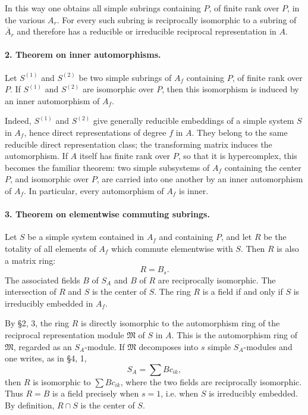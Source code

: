 \documentclass[11pt]{article}
\providecommand{\frM}{\mathfrak M}
\begin{document}
In this way one obtains all simple subrings containing \(P\), of finite rank over \(P\), in the various \(A_r\). For every such subring is reciprocally isomorphic to a subring of \(\overline A_r\) and therefore has a reducible or irreducible reciprocal representation in \(A\).

\paragraph{2. Theorem on inner automorphisms.}
Let \(S^{(1)}\) and \(S^{(2)}\) be two simple subrings of \(A_f\) containing \(P\), of finite rank over \(P\). If \(S^{(1)}\) and \(S^{(2)}\) are isomorphic over \(P\), then this isomorphism is induced by an inner automorphism of \(A_f\).

Indeed, \(S^{(1)}\) and \(S^{(2)}\) give generally reducible embeddings of a simple system \(S\) in \(A_f\), hence direct representations of degree \(f\) in \(A\). They belong to the same reducible direct representation class; the transforming matrix induces the automorphism. If \(A\) itself has finite rank over \(P\), so that it is hypercomplex, this becomes the familiar theorem: two simple subsystems of \(A_f\) containing the center \(P\), and isomorphic over \(P\), are carried into one another by an inner automorphism of \(A_f\). In particular, every automorphism of \(A_f\) is inner.

\paragraph{3. Theorem on elementwise commuting subrings.}
Let \(S\) be a simple system contained in \(A_f\) and containing \(P\), and let \(R\) be the totality of all elements of \(A_f\) which commute elementwise with \(S\). Then \(R\) is also a matrix ring:
\[
        R=B_s.
\]
The associated fields \(B\) of \(S_A\) and \(B\) of \(R\) are reciprocally isomorphic. The intersection of \(R\) and \(S\) is the center of \(S\). The ring \(R\) is a field if and only if \(S\) is irreducibly embedded in \(A_f\).

By §2, 3, the ring \(R\) is directly isomorphic to the automorphism ring of the reciprocal representation module \(\frM\) of \(S\) in \(A\). This is the automorphism ring of \(\frM\), regarded as an \(S_A\)-module. If \(\frM\) decomposes into \(s\) simple \(S_A\)-modules and one writes, as in §4, 1,
\[
        S_A=\sum Bc_{ik},
\]
then \(R\) is isomorphic to \(\sum Bc_{ik}\), where the two fields are reciprocally isomorphic. Thus \(R=B\) is a field precisely when \(s=1\), i.e. when \(S\) is irreducibly embedded. By definition, \(R\cap S\) is the center of \(S\).
\end{document}

